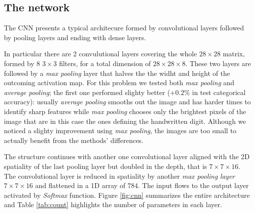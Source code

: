 \documentclass[compsoc]{IEEEtran}
\begin{document}
\subsection{The network}
The CNN presents a typical architecure formed by convolutional layers followed by pooling layers and ending with dense layers. \par
In particular there are 2 convulutional layers covering the whole $28 \times 28$ matrix, formed by 8 $3 \times 3$ filters, for a total dimension of $28 \times 28 \times 8$. These two layers are followed by a \emph{max pooling} layer that halves the the widht and height of the outcoming activation map. For this problem we tested both \emph{max pooling} and \emph{average pooling}; the first one performed slighty better ($+0.2\%$ in test categorical accuracy): usually \emph{average pooling} smooths out the image and has harder times to identify sharp features while \emph{max pooling} chooses only the brightest pixels of the image that are in this case the ones defining the handwritten digit. Although we noticed a slighty improvement using \emph{max pooling}, the images are too small to actually benefit from the methods' differences. \par
The structure continues with another one convolutional layer aligned with the 2D spatiality of the last pooling layer but doubled in the depth, that is $7 \times 7 \times 16$. The convolutional layer is reduced in spatiality by another \emph{max pooling layer} $7 \times 7 \times 16$ and flattened in a 1D array of $784$. The input flows to the output layer activated by \emph{Softmax} function. Figure \ref{fig:cnn} summarizes the entire architecture and Table \ref{tab:count} highlights the number of parameters in each layer.
\end{document}
